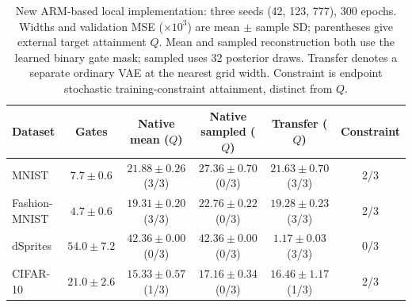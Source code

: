 \begin{table}[H]
\caption{New ARM-based local implementation: three seeds (42, 123, 777), 300 epochs. Widths and validation MSE ($\times10^3$) are mean $\pm$ sample SD; parentheses give external target attainment $Q$. Mean and sampled reconstruction both use the learned binary gate mask; sampled uses 32 posterior draws. Transfer denotes a separate ordinary VAE at the nearest grid width. Constraint is endpoint stochastic training-constraint attainment, distinct from $Q$.}\label{tab:armnew}
\footnotesize
\setlength{\tabcolsep}{3pt}
\begin{tabular*}{\textwidth}{@{\extracolsep{\fill}}lccccc@{}}
\toprule
Dataset & Gates & Native mean ($Q$) & Native sampled ($Q$) & Transfer ($Q$) & Constraint \\
\midrule
MNIST & $7.7 \pm 0.6$ & $21.88 \pm 0.26$ (3/3) & $27.36 \pm 0.70$ (0/3) & $21.63 \pm 0.70$ (3/3) & 2/3 \\
Fashion-MNIST & $4.7 \pm 0.6$ & $19.31 \pm 0.20$ (3/3) & $22.76 \pm 0.22$ (0/3) & $19.28 \pm 0.23$ (3/3) & 2/3 \\
dSprites & $54.0 \pm 7.2$ & $42.36 \pm 0.00$ (0/3) & $42.36 \pm 0.00$ (0/3) & $1.17 \pm 0.03$ (3/3) & 0/3 \\
CIFAR-10 & $21.0 \pm 2.6$ & $15.33 \pm 0.57$ (1/3) & $17.16 \pm 0.34$ (0/3) & $16.46 \pm 1.17$ (1/3) & 2/3 \\
\bottomrule\end{tabular*}
\end{table}
